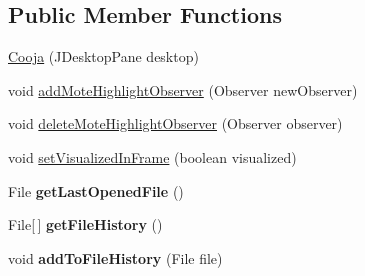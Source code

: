 \subsection*{Public Member Functions}
\begin{DoxyCompactItemize}
\item 
\hyperlink{classorg_1_1contikios_1_1cooja_1_1Cooja_a2c7f9c93a2e946643755a6ab895299b5}{Cooja} (J\-Desktop\-Pane desktop)
\item 
void \hyperlink{classorg_1_1contikios_1_1cooja_1_1Cooja_afb7b606f3e30dfb4157190d8609f5c94}{add\-Mote\-Highlight\-Observer} (Observer new\-Observer)
\item 
void \hyperlink{classorg_1_1contikios_1_1cooja_1_1Cooja_aff35b66b1cfdf1868519864afefb69f1}{delete\-Mote\-Highlight\-Observer} (Observer observer)
\item 
void \hyperlink{classorg_1_1contikios_1_1cooja_1_1Cooja_ac6e4572107fbc8d51ff997ecfa2ba0d8}{set\-Visualized\-In\-Frame} (boolean visualized)
\item 
\hypertarget{classorg_1_1contikios_1_1cooja_1_1Cooja_a5119356c7801fd5f4dd95ca2cc6cfe88}{File {\bfseries get\-Last\-Opened\-File} ()}\label{classorg_1_1contikios_1_1cooja_1_1Cooja_a5119356c7801fd5f4dd95ca2cc6cfe88}

\item 
\hypertarget{classorg_1_1contikios_1_1cooja_1_1Cooja_a6627d55537ae3adc448d3880fc56afa7}{File\mbox{[}$\,$\mbox{]} {\bfseries get\-File\-History} ()}\label{classorg_1_1contikios_1_1cooja_1_1Cooja_a6627d55537ae3adc448d3880fc56afa7}

\item 
\hypertarget{classorg_1_1contikios_1_1cooja_1_1Cooja_a419fb67e62459ca3d629e6d20a2a9933}{void {\bfseries add\-To\-File\-History} (File file)}\label{classorg_1_1contikios_1_1cooja_1_1Cooja_a419fb67e62459ca3d629e6d20a2a9933}


\end{DoxyCompactItemize}
